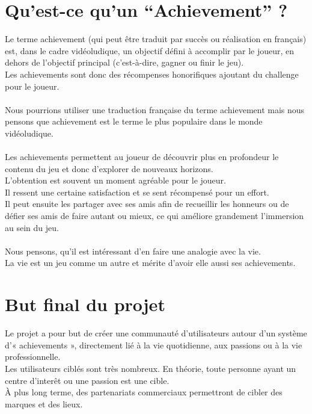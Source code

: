 \documentclass{life-fr}
\begin{document}
\section{Qu'est-ce qu'un ``Achievement'' ?}
Le terme achievement (qui peut être traduit par succès ou réalisation en français) est, dans le cadre vidéoludique,  un objectif défini à accomplir par le joueur, en dehors de l’objectif principal (c’est-à-dire, gagner ou finir le jeu).\\
 Les achievements sont donc des récompenses honorifiques ajoutant du challenge pour le joueur.\\
\\
Nous pourrions utiliser une traduction française du terme achievement mais nous pensons que achievement est le terme le plus populaire dans le monde vidéoludique.\\
\\
Les achievements permettent au joueur de découvrir plus en profondeur le contenu du jeu et donc d’explorer de nouveaux horizons.\\
 L’obtention est souvent un moment agréable pour le joueur.\\
 Il ressent une certaine satisfaction et se sent récompensé pour un effort.\\
 Il peut ensuite les partager avec ses amis afin de recueillir les honneurs ou de défier ses amis de faire autant ou mieux, ce qui améliore grandement l’immersion au sein du jeu.\\
\\
Nous pensons, qu’il est intéressant d’en faire une analogie avec la vie.\\
 La vie est un jeu comme un autre et mérite d’avoir elle aussi ses achievements.

\section{But final du projet}

Le projet a pour but de créer une communauté d'utilisateurs autour d'un système d'« achievements », directement lié à la vie quotidienne, aux passions ou à la vie professionnelle.\\

Les utilisateurs ciblés sont très nombreux. En théorie, toute personne ayant un centre d'interêt ou une passion est une cible.\\

À plus long terme, des partenariats commerciaux permettront de cibler des marques et des lieux.\\
\end{document}
